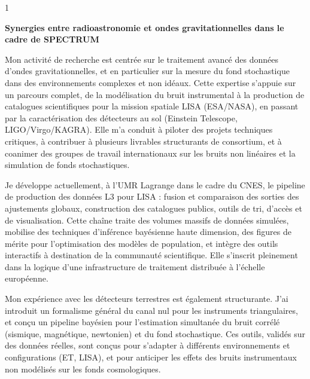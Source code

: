 \documentclass[10pt,a4paper]{altacv}
\begin{document}
\makecvheader


\begin{paracol}{1}



{\color{body}
\textbf{Synergies entre radioastronomie et ondes gravitationnelles dans le cadre de SPECTRUM}

Mon activité de recherche est centrée sur le traitement avancé des données d'ondes gravitationnelles, et en particulier sur la mesure du fond stochastique dans des environnements complexes et non idéaux. Cette expertise s'appuie sur un parcours complet, de la modélisation du bruit instrumental à la production de catalogues scientifiques pour la mission spatiale LISA (ESA/NASA), en passant par la caractérisation des détecteurs au sol (Einstein Telescope, LIGO/Virgo/KAGRA). Elle m'a conduit à piloter des projets techniques critiques, à contribuer à plusieurs livrables structurants de consortium, et à coanimer des groupes de travail internationaux sur les bruits non linéaires et la simulation de fonds stochastiques.

Je développe actuellement, à l'UMR Lagrange dans le cadre du CNES, le pipeline de production des données L3 pour LISA : fusion et comparaison des sorties des ajustements globaux, construction des catalogues publics, outils de tri, d'accès et de visualisation. Cette chaîne traite des volumes massifs de données simulées, mobilise des techniques d'inférence bayésienne haute dimension, des figures de mérite pour l'optimisation des modèles de population, et intègre des outils interactifs à destination de la communauté scientifique. Elle s'inscrit pleinement dans la logique d'une infrastructure de traitement distribuée à l'échelle européenne.

Mon expérience avec les détecteurs terrestres est également structurante. J'ai introduit un formalisme général du canal nul pour les instruments triangulaires, et conçu un pipeline bayésien pour l'estimation simultanée du bruit corrélé (sismique, magnétique, newtonien) et du fond stochastique. Ces outils, validés sur des données réelles, sont conçus pour s'adapter à différents environnements et configurations (ET, LISA), et pour anticiper les effets des bruits instrumentaux non modélisés sur les fonds cosmologiques.

}
\end{paracol}
\end{document}
